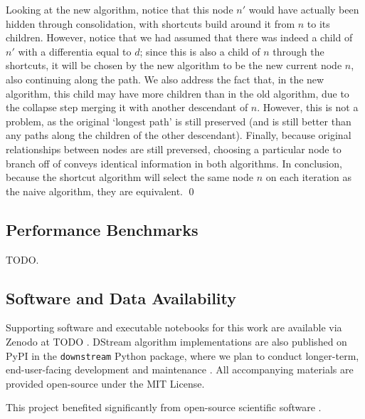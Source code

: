 Looking at the new algorithm, notice that this node $n'$ would have actually been hidden through consolidation, with shortcuts build around it from $n$ to its children. However, notice that we had assumed that there was indeed a child of $n'$ with a differentia equal to $d$; since this is also a child of $n$ through the shortcuts, it will be chosen by the new algorithm to be the new current node $n$, also continuing along the path. We also address the fact that, in the new algorithm, this child may have more children than in the old algorithm, due to the collapse step merging it with another descendant of $n$. However, this is not a problem, as the original `longest path' is still preserved (and is still better than any paths along the children of the other descendant). Finally, because original relationships between nodes are still preversed, choosing a particular node to branch off of conveys identical information in both algorithms. In conclusion, because the shortcut algorithm will select the same node $n$ on each iteration as the naive algorithm, they are equivalent. \qed

\subsection{Performance Benchmarks}

TODO.

\subsection{Software and Data Availability} \label{sec:materials}



Supporting software and executable notebooks for this work are available via Zenodo at TODO \citep{moreno2024hsurf}.
DStream algorithm implementations are also published on PyPI in the \texttt{downstream} Python package, where we plan to conduct longer-term, end-user-facing development and maintenance \citep{moreno2024downstream}.
All accompanying materials are provided open-source under the MIT License.

This project benefited significantly from open-source scientific software \citep{2020SciPy-NMeth,harris2020array,reback2020pandas,mckinney-proc-scipy-2010,waskom2021seaborn,hunter2007matplotlib,moreno2023teeplot}.
